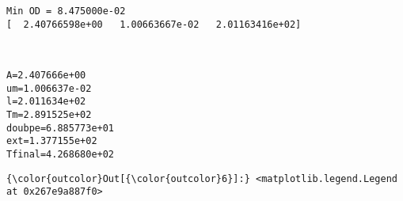 \documentclass[11pt]{article}
\begin{document}
    \begin{Verbatim}[commandchars=\\\{\}]
Min OD = 8.475000e-02
[  2.40766598e+00   1.00663667e-02   2.01163416e+02]

    \end{Verbatim}

    \begin{center}
    \end{center}
    { \hspace*{\fill} \\}
    
    \begin{Verbatim}[commandchars=\\\{\}]
A=2.407666e+00
um=1.006637e-02
l=2.011634e+02
Tm=2.891525e+02
doubpe=6.885773e+01
ext=1.377155e+02
Tfinal=4.268680e+02

    \end{Verbatim}

            \begin{Verbatim}[commandchars=\\\{\}]
{\color{outcolor}Out[{\color{outcolor}6}]:} <matplotlib.legend.Legend at 0x267e9a887f0>
\end{Verbatim}
        
    \begin{center}
    \end{center}
    { \hspace*{\fill} \\}
    
    \begin{center}
    \end{center}
    { \hspace*{\fill} \\}
    
\end{document}

